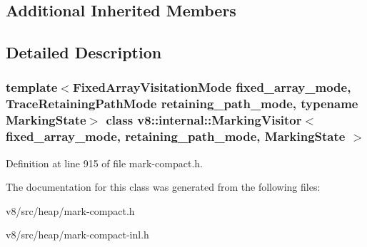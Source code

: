 \subsection*{Additional Inherited Members}


\subsection{Detailed Description}
\subsubsection*{template$<$Fixed\+Array\+Visitation\+Mode fixed\+\_\+array\+\_\+mode, Trace\+Retaining\+Path\+Mode retaining\+\_\+path\+\_\+mode, typename Marking\+State$>$\newline
class v8\+::internal\+::\+Marking\+Visitor$<$ fixed\+\_\+array\+\_\+mode, retaining\+\_\+path\+\_\+mode, Marking\+State $>$}



Definition at line 915 of file mark-\/compact.\+h.



The documentation for this class was generated from the following files\+:\begin{DoxyCompactItemize}
\item 
v8/src/heap/mark-\/compact.\+h\item 
v8/src/heap/mark-\/compact-\/inl.\+h\end{DoxyCompactItemize}
